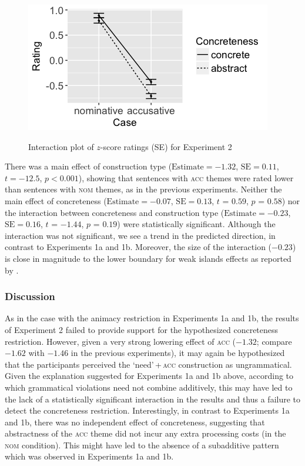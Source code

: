 \documentclass[output=paper]{langscibook}
\begin{document}
\begin{figure}
\caption{Interaction plot of $z$-score ratings (SE) for Experiment 2}
\centering
\includegraphics[scale = 0.5]{figures/exp2_13.png}
\label{fig:exp2}
\end{figure}

There was a main effect of construction type ($\text{Estimate} =-1.32$, $\text{SE} =0.11$, $t = -12.5$, $p < 0.001$), showing that sentences with \textsc{acc} themes were rated lower than sentences with \textsc{nom} themes, as in the previous experiments. Neither the main effect of concreteness ($\text{Estimate} =-0.07$, $\text{SE} =0.13$, $t$ = $0.59$, $p$ = $0.58$) nor the interaction between concreteness and construction type ($\text{Estimate} =-0.23$, $\text{SE} =0.16$, $t$ = $-1.44$, $p$ = $0.19$) were statistically significant. Although the interaction was not significant, we see a trend in the predicted direction, in contrast to Experiments 1a and 1b. Moreover, the size of the interaction ($-0.23$) is close in magnitude to the lower boundary for weak islands effects as reported by \citet{Kush.Lohndal.Sprouse2018}.

\subsubsection{Discussion}

As in the case with the animacy restriction in Experiments 1a and 1b, the results of Experiment 2 failed to provide support for the hypothesized concreteness restriction. However, given a very strong lowering effect of \textsc{acc} ($-1.32$; compare $-1.62$ with $-1.46$ in the previous experiments), it may again be hypothesized that the participants perceived the `need'\,+\,\textsc{acc} construction as ungrammatical. Given the explanation suggested for Experiments 1a and 1b above, according to which grammatical violations need not combine additively, this may have led to the lack of a statistically significant interaction in the results and thus a failure to detect the concreteness restriction. Interestingly, in contrast to Experiments 1a and 1b, there was no independent effect of concreteness, suggesting that abstractness of the \textsc{acc} theme did not incur any extra processing costs (in the \textsc{nom} condition). This might have led to the absence of a subadditive pattern which was observed in Experiments 1a and 1b.
\end{document}
